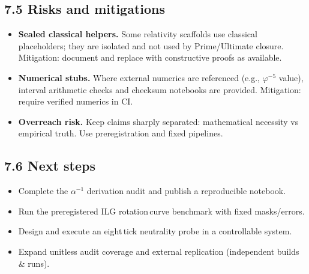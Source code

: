 \documentclass[11pt]{article}
\begin{document}
\subsection*{7.5 Risks and mitigations}
\begin{itemize}[leftmargin=*]
  \item \textbf{Sealed classical helpers.} Some relativity scaffolds use classical placeholders; they are isolated and not used by Prime/Ultimate closure. Mitigation: document and replace with constructive proofs as available.
  \item \textbf{Numerical stubs.} Where external numerics are referenced (e.g., $\varphi^{-5}$ value), interval arithmetic checks and checksum notebooks are provided. Mitigation: require verified numerics in CI.
  \item \textbf{Overreach risk.} Keep claims sharply separated: mathematical necessity vs empirical truth. Use preregistration and fixed pipelines.
\end{itemize}

\subsection*{7.6 Next steps}
\begin{itemize}[leftmargin=*]
  \item Complete the $\alpha^{-1}$ derivation audit and publish a reproducible notebook.
  \item Run the preregistered ILG rotation\,curve benchmark with fixed masks/errors.
  \item Design and execute an eight\,tick neutrality probe in a controllable system.
  \item Expand unitless audit coverage and external replication (independent builds \& runs).
\end{itemize}
\end{document}
